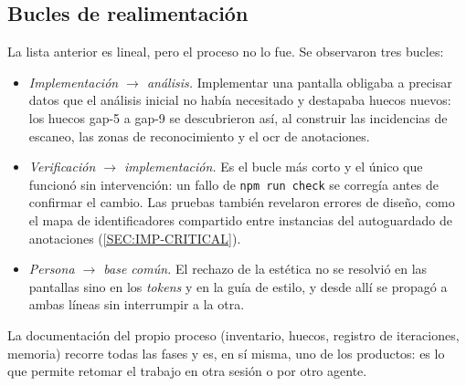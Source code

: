 \subsection{Bucles de realimentación}

La lista anterior es lineal, pero el proceso no lo fue. Se observaron tres bucles:
\begin{itemize}
  \item \emph{Implementación $\rightarrow$ análisis.} Implementar una pantalla obligaba a
        precisar datos que el análisis inicial no había necesitado y destapaba huecos nuevos:
        los huecos gap-5 a gap-9 se descubrieron así, al construir las incidencias de
        escaneo, las zonas de reconocimiento y el \acs{ocr} de anotaciones.
  \item \emph{Verificación $\rightarrow$ implementación.} Es el bucle más corto y el único
        que funcionó sin intervención: un fallo de \texttt{npm run check} se corregía antes
        de confirmar el cambio. Las pruebas también revelaron errores de diseño, como el
        mapa de identificadores compartido entre instancias del autoguardado de
        anotaciones (\cref{SEC:IMP-CRITICAL}).
  \item \emph{Persona $\rightarrow$ base común.} El rechazo de la estética no se resolvió
        en las pantallas sino en los \textit{tokens} y en la guía de estilo, y desde allí se
        propagó a ambas líneas sin interrumpir a la otra.
\end{itemize}
La documentación del propio proceso (inventario, huecos, registro de iteraciones, memoria)
recorre todas las fases y es, en sí misma, uno de los productos: es lo que permite retomar
el trabajo en otra sesión o por otro agente.
